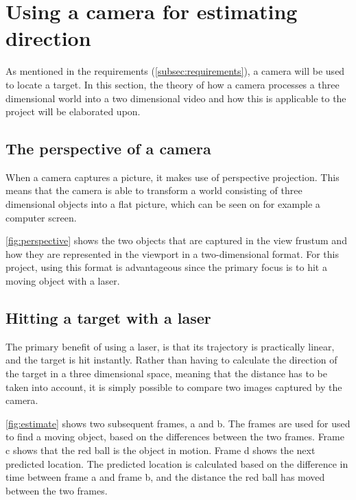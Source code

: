 \section{Using a camera for estimating direction}
As mentioned in the requirements (\autoref{subsec:requirements}), a camera will be used to locate a target.
In this section, the theory of how a camera processes a three dimensional world into a two dimensional video and how this is applicable to the project will be elaborated upon.

\subsection{The perspective of a camera}
When a camera captures a picture, it makes use of perspective projection.
This means that the camera is able to transform a world consisting of three dimensional objects into a flat picture, which can be seen on for example a computer screen.


\autoref{fig:perspective} shows the two objects that are captured in the view frustum and how they are represented in the viewport in a two-dimensional format.
For this project, using this format is advantageous since the primary focus is to hit a moving object with a laser.

\subsection{Hitting a target with a laser}
The primary benefit of using a laser, is that its trajectory is practically linear, and the target is hit instantly.
Rather than having to calculate the direction of the target in a three dimensional space, meaning that the distance has to be taken into account, it is simply possible to compare two images captured by the camera.

\autoref{fig:estimate} shows two subsequent frames, a and b.
The frames are used for used to find a moving object, based on the differences between the two frames.
Frame c shows that the red ball is the object in motion.
Frame d shows the next predicted location.
The predicted location is calculated based on the difference in time between frame a and frame b, and the distance the red ball has moved between the two frames.

